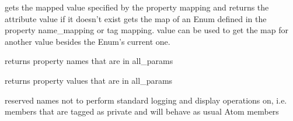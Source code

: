 \documentclass[letterpaper,10pt,english]{sphinxmanual}
\begin{document}

\begin{fulllineitems}
\label{core_doc/atom_extension:taref.core.atom_extension.get_map}
gets the mapped value specified by the property mapping and returns the attribute value if it doesn't exist
gets the map of an Enum defined in the property name\_mapping or tag mapping.
value can be used to get the map for another value besides the Enum's current one.

\end{fulllineitems}


\begin{fulllineitems}
\label{core_doc/atom_extension:taref.core.atom_extension.get_property_names}
returns property names that are in all\_params

\end{fulllineitems}


\begin{fulllineitems}
\label{core_doc/atom_extension:taref.core.atom_extension.get_property_values}
returns property values that are in all\_params

\end{fulllineitems}


\begin{fulllineitems}
\label{core_doc/atom_extension:taref.core.atom_extension.get_reserved_names}
reserved names not to perform standard logging and display operations on,
i.e. members that are tagged as private and will behave as usual Atom members

\end{fulllineitems}

\end{document}
